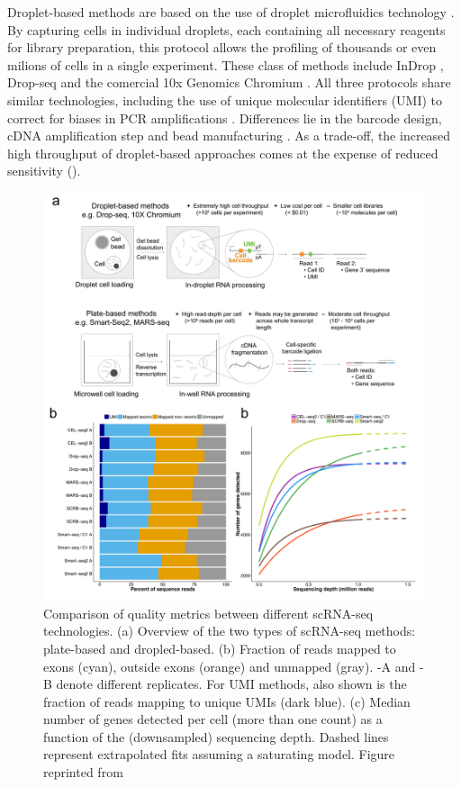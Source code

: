 Droplet-based methods are based on the use of droplet microfluidics technology \cite{Zhang2019}. By capturing cells in individual droplets, each containing all necessary reagents for library preparation, this protocol allows the profiling of thousands or even milions of cells in a single experiment. These class of methods include InDrop \cite{Klein2015,Zilionis2016}, Drop-seq\cite{Macosko2015} and the comercial 10x Genomics Chromium \cite{Zheng2017}. All three protocols share similar technologies, including the use of unique molecular identifiers (UMI) to correct for biases in PCR amplifications \cite{Kivioja2011}. Differences lie in the barcode design, cDNA amplification step and bead manufacturing \cite{Zhang2019}. As a trade-off, the increased high throughput of droplet-based approaches comes at the expense of reduced sensitivity\cite{Ziegenhain2017,Wang2019,Svensson2017} ().

\begin{figure}[H]
	\centering
	\includegraphics[width=0.85\linewidth]{scRNA_seq_comparison}
	\caption[]{Comparison of quality metrics between different scRNA-seq technologies. (a) Overview of the two types of scRNA-seq methods: plate-based and dropled-based. (b) Fraction of reads mapped to exons (cyan), outside exons (orange) and unmapped (gray). -A and -B denote different replicates. For UMI methods, also shown is the fraction of reads mapping to unique UMIs (dark blue). (c) Median number of genes detected per cell (more than one count) as a function of the (downsampled) sequencing depth. Dashed lines represent extrapolated fits assuming a saturating model. Figure reprinted from \cite{Ziegenhain2017} }
	\label{fig:scRNA_seq_comparison}
\end{figure}

